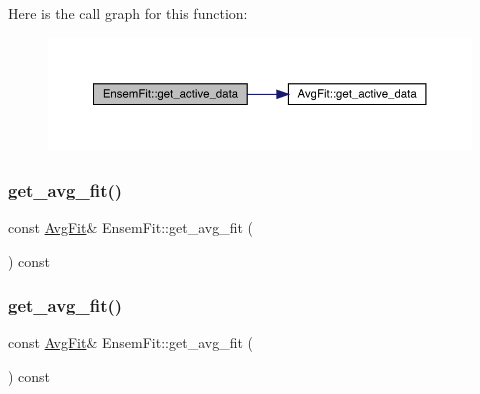 Here is the call graph for this function\+:
\nopagebreak
\begin{figure}[H]
\begin{center}
\leavevmode
\includegraphics[width=350pt]{dc/dae/classEnsemFit_a562d0418f52bf3491752e53a1f65f13b_cgraph}
\end{center}
\end{figure}
\mbox{\label{classEnsemFit_ad84c2ab3c1bce4d11140ff275acd27ae}} 
\subsubsection{\texorpdfstring{get\_avg\_fit()}{get\_avg\_fit()}\hspace{0.1cm}{\footnotesize\ttfamily [1/2]}}
{\footnotesize\ttfamily const \mbox{\hyperlink{classAvgFit}{Avg\+Fit}}\& Ensem\+Fit\+::get\+\_\+avg\+\_\+fit (\begin{DoxyParamCaption}{ }\end{DoxyParamCaption}) const\hspace{0.3cm}{\ttfamily [inline]}}

\mbox{\label{classEnsemFit_ad84c2ab3c1bce4d11140ff275acd27ae}} 
\subsubsection{\texorpdfstring{get\_avg\_fit()}{get\_avg\_fit()}\hspace{0.1cm}{\footnotesize\ttfamily [2/2]}}
{\footnotesize\ttfamily const \mbox{\hyperlink{classAvgFit}{Avg\+Fit}}\& Ensem\+Fit\+::get\+\_\+avg\+\_\+fit (\begin{DoxyParamCaption}{ }\end{DoxyParamCaption}) const\hspace{0.3cm}{\ttfamily [inline]}}

\mbox{\label{classEnsemFit_a4122f6735d730a4759cc134056b8aa96}} 
